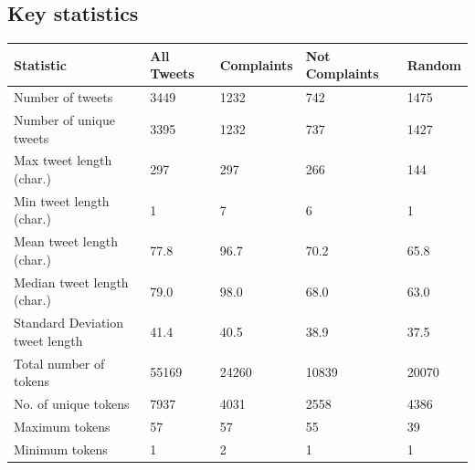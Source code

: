 \subsection{Key statistics}
\begin{table}[htbp]
    \captionsetup{font=small}
    \small
    \centering
    \begin{tabularx}{\textwidth}{|l|X|X|X|X|}
        \hline
        \rowcolor[gray]{0.7}
        \textbf{Statistic}              & \textbf{All Tweets} & \textbf{Complaints} & \textbf{Not Complaints} & \textbf{Random} \\
        \hline
        Number of tweets                & 3449                & 1232                & 742                     & 1475            \\
        \rowcolor[gray]{0.9}
        Number of unique tweets         & 3395                & 1232                & 737                     & 1427            \\
        \hline
        \hline
        Max tweet length (char.)        & 297                 & 297                 & 266                     & 144             \\
        \rowcolor[gray]{0.9}
        Min tweet length (char.)        & 1                   & 7                   & 6                       & 1               \\
        Mean tweet length (char.)       & 77.8                & 96.7                & 70.2                    & 65.8            \\
        \rowcolor[gray]{0.9}
        Median tweet length (char.)     & 79.0                & 98.0                & 68.0                    & 63.0            \\
        Standard Deviation tweet length & 41.4                & 40.5                & 38.9                    & 37.5            \\
        \hline
        \hline
        Total number of tokens          & 55169               & 24260               & 10839                   & 20070           \\
        \rowcolor[gray]{0.9}
        No. of unique tokens            & 7937                & 4031                & 2558                    & 4386            \\
        Maximum tokens                  & 57                  & 57                  & 55                      & 39              \\
        \rowcolor[gray]{0.9}
        Minimum tokens                  & 1                   & 2                   & 1                       & 1               \\

\end{tabularx}
\end{table}
